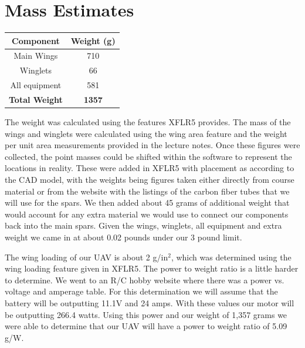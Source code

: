 \section{Mass Estimates}

    \begin{center}
    \begin{tabular}{|c|c|} 
    \hline
        \textbf{Component} & \textbf{Weight (g)} \\ \hline
        Main Wings & 710 \\ \hline
        Winglets & 66 \\ \hline
        All equipment & 581 \\ \hline
        \textbf{Total Weight} & \textbf{1357} \\ \hline
    \end{tabular}
    \end{center}

    The weight was calculated using the features XFLR5 provides. The mass of the wings and winglets were calculated using the wing area feature and the weight per unit area measurements provided in the lecture notes. Once these figures were collected, the point masses could be shifted within the software to represent the locations in reality. These were added in XFLR5 with placement as according to the CAD model, with the weights being figures taken either directly from course material or from the website with the listings of the carbon fiber tubes that we will use for the spars. We then added about 45 grams of additional weight that would account for any extra material we would use to connect our components back into the main spars. Given the wings, winglets, all equipment and extra weight we came in at about 0.02 pounds under our 3 pound limit. 
    
    The wing loading of our UAV is about 2 g/in$^2$, which was determined using the wing loading feature given in XFLR5. The power to weight ratio is a little harder to determine. We went to an R/C hobby website where there was a power vs. voltage and amperage table. For this determination we will assume that the battery will be outputting 11.1V and 24 amps. With these values our motor will be outputting 266.4 watts. Using this power and our weight of 1,357 grams we were able to determine that our UAV will have a power to weight ratio of 5.09 g/W.



